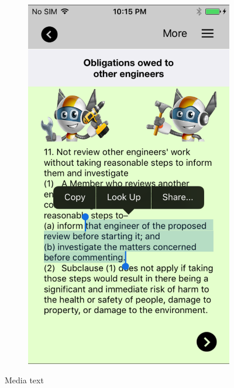 \begin{figure}[H]
\begin{subfigure}{0.27\textwidth}
\includegraphics[width=\textwidth]{text2}
\caption{}
 \end{subfigure}\hspace{0.5\textwidth}
  \caption{Media text}
\end{figure}

